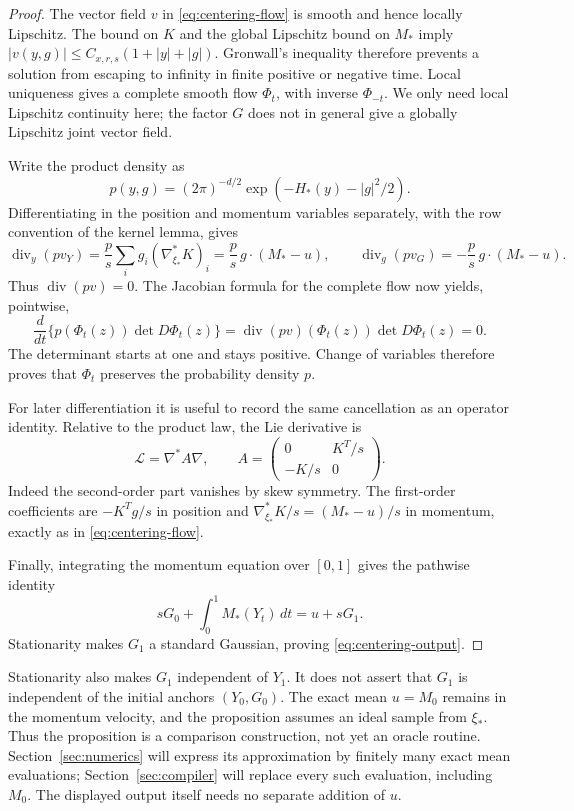 \begin{proof}
The vector field $v$ in \eqref{eq:centering-flow} is smooth and hence
locally Lipschitz.  The bound on $K$ and the global Lipschitz bound on
$M_*$ imply $|v(y,g)|\le C_{x,r,s}(1+|y|+|g|)$.  Gronwall's
inequality therefore prevents a solution from escaping to infinity
in finite positive or negative time.  Local uniqueness gives a
complete smooth flow $\Phi_t$, with inverse $\Phi_{-t}$.  We only
need local Lipschitz continuity here; the factor $G$ does not in
general give a globally Lipschitz joint vector field.

Write the product density as
\[
 p(y,g)=(2\pi)^{-d/2}\exp(-H_*(y)-|g|^2/2).
\]
Differentiating in the position and momentum variables separately,
with the row convention of the kernel lemma, gives
\[
 \operatorname{div}_y(pv_Y)
   =\frac{p}{s}\sum_i g_i(\nabla_{\xi_*}^*K)_i
   =\frac{p}{s}\,g\cdot(M_*-u),\qquad
 \operatorname{div}_g(pv_G)
   =-\frac{p}{s}\,g\cdot(M_*-u).
\]
Thus $\operatorname{div}(pv)=0$.  The Jacobian formula for the
complete flow now yields, pointwise,
\[
 \frac{d}{dt}\{p(\Phi_t(z))\det D\Phi_t(z)\}
   =\operatorname{div}(pv)(\Phi_t(z))\det D\Phi_t(z)=0.
\]
The determinant starts at one and stays positive.  Change of variables
therefore proves that $\Phi_t$ preserves the probability density $p$.

For later differentiation it is useful to record the same cancellation
as an operator identity.  Relative to the product law, the Lie
derivative is
\begin{equation}\label{eq:centering-skew-operator}
 \mathcal L=\nabla^*A\nabla,\qquad
 A=\begin{pmatrix}0&K^T/s\\-K/s&0\end{pmatrix}.
\end{equation}
Indeed the second-order part vanishes by skew symmetry.  The
first-order coefficients are $-K^Tg/s$ in position and
$\nabla_{\xi_*}^*K/s=(M_*-u)/s$ in momentum, exactly as in
\eqref{eq:centering-flow}.

Finally, integrating the momentum equation over $[0,1]$ gives the
pathwise identity
\[
 sG_0+\int_0^1M_*(Y_t)\,dt=u+sG_1.
\]
Stationarity makes $G_1$ a standard Gaussian, proving
\eqref{eq:centering-output}.
\end{proof}

Stationarity also makes $G_1$ independent of $Y_1$.  It does not assert
that $G_1$ is independent of the initial anchors $(Y_0,G_0)$.
The exact mean $u=M_0$ remains in the momentum velocity, and the
proposition assumes an ideal sample from $\xi_*$.  Thus the proposition
is a comparison construction, not yet an oracle routine.  Section~\ref{sec:numerics}
will express its approximation by finitely many exact mean evaluations;
Section~\ref{sec:compiler} will replace every such evaluation, including
$M_0$.  The displayed output itself needs no separate addition of $u$.

